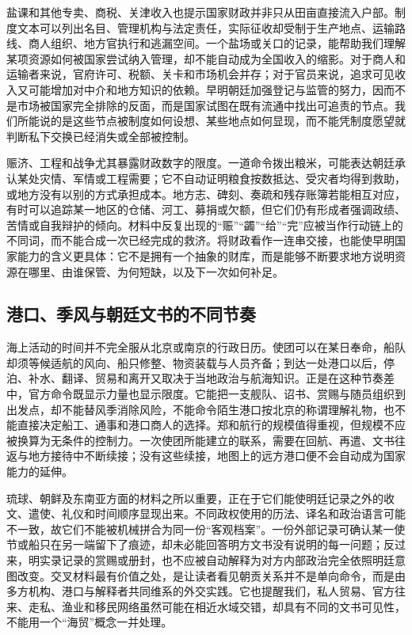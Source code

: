 盐课和其他专卖、商税、关津收入也提示国家财政并非只从田亩直接流入户部。制度文本可以列出名目、管理机构与法定责任，实际征收却受制于生产地点、运输路线、商人组织、地方官执行和逃漏空间。一个盐场或关口的记录，能帮助我们理解某项资源如何被国家尝试纳入管理，却不能自动成为全国收入的缩影。对于商人和运输者来说，官府许可、税额、关卡和市场机会并存；对于官员来说，追求可见收入又可能增加对中介和地方知识的依赖。早明朝廷加强登记与监管的努力，因而不是市场被国家完全排除的反面，而是国家试图在既有流通中找出可追责的节点。我们所能说的是这些节点被制度如何设想、某些地点如何显现，而不能凭制度愿望就判断私下交换已经消失或全部被控制。

赈济、工程和战争尤其暴露财政数字的限度。一道命令拨出粮米，可能表达朝廷承认某处灾情、军情或工程需要；它不自动证明粮食按数抵达、受灾者均得到救助，或地方没有以别的方式承担成本。地方志、碑刻、奏疏和残存账簿若能相互对应，有时可以追踪某一地区的仓储、河工、募捐或欠额，但它们仍有形成者强调政绩、苦情或自我辩护的倾向。材料中反复出现的“赈”“蠲”“给”“完”应被当作行动链上的不同词，而不能合成一次已经完成的救济。将财政看作一连串交接，也能使早明国家能力的含义更具体：它不是拥有一个抽象的财库，而是能够不断要求地方说明资源在哪里、由谁保管、为何短缺，以及下一次如何补足。

\subsection{港口、季风与朝廷文书的不同节奏}

海上活动的时间并不完全服从北京或南京的行政日历。使团可以在某日奉命，船队却须等候适航的风向、船只修整、物资装载与人员齐备；到达一处港口以后，停泊、补水、翻译、贸易和离开又取决于当地政治与航海知识。正是在这种节奏差中，官方命令既显示力量也显示限度。它能把一支舰队、诏书、赏赐与随员组织到出发点，却不能替风季消除风险，不能命令陌生港口按北京的称谓理解礼物，也不能直接决定船工、通事和港口商人的选择。郑和航行的规模值得重视，但规模不应被换算为无条件的控制力。一次使团所能建立的联系，需要在回航、再遣、文书往返与地方接待中不断续接；没有这些续接，地图上的远方港口便不会自动成为国家能力的延伸。

琉球、朝鲜及东南亚方面的材料之所以重要，正在于它们能使明廷记录之外的收文、遣使、礼仪和时间顺序显现出来。不同政权使用的历法、译名和政治语言可能不一致，故它们不能被机械拼合为同一份“客观档案”。一份外部记录可确认某一使节或船只在另一端留下了痕迹，却未必能回答明方文书没有说明的每一问题；反过来，明实录记录的赏赐或册封，也不应被自动解释为对方内部政治完全依照明廷意图改变。交叉材料最有价值之处，是让读者看见朝贡关系并不是单向命令，而是由多方机构、港口与解释者共同维系的外交实践。它也提醒我们，私人贸易、官方往来、走私、渔业和移民网络虽然可能在相近水域交错，却具有不同的文书可见性，不能用一个“海贸”概念一并处理。

